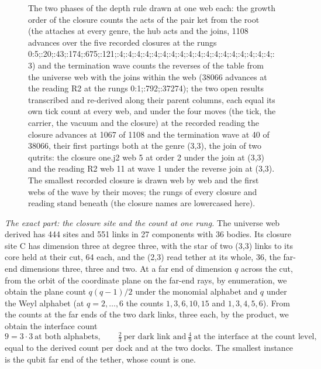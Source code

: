 \begin{chproof}
\begin{figure}[htbp]
\caption{The two phases of the depth rule drawn at one web each: the growth order of the closure counts the acts of the pair ket from the root (the attaches at every genre, the hub acts and the joins, 1108 advances over the five recorded closures at the rungs 0:5;:20;:43;:174;:675;:121;:4;:4;:4;:4;:4;:4;:4;:4;:4;:4;:4;:4;:4;:4;:4;:4;:4;:4;:3) and the termination wave counts the reverses of the table from the universe web with the joins within the web (38066 advances at the reading R2 at the rungs 0:1;:792;:37274); the two open results transcribed and re-derived along their parent columns, each equal its own tick count at every web, and under the four moves (the tick, the carrier, the vacuum and the closure) at the recorded reading the closure advances at 1067 of 1108 and the termination wave at 40 of 38066, their first partings both at the genre (3,3), the join of two qutrits: the closure one.j2 web 5 at order 2 under the join at (3,3) and the reading R2 web 11 at wave 1 under the reverse join at (3,3). The smallest recorded closure is drawn web by web and the first webs of the wave by their moves; the rungs of every closure and reading stand beneath (the closure names are lowercased here).}\label{fig:X-3-D544514-two-phases}
\end{figure}

\textit{The exact part: the closure site and the count at one rung.} The universe web derived has 444 sites and 551 links in 27 components with 36 bodies. Its closure site C has dimension three at degree three, with the star of two (3,3) links to its core held at their cut, 64 each, and the (2,3) read tether at its whole, 36, the far-end dimensions three, three and two. At a far end of dimension $q$ across the cut, from the orbit of the coordinate plane on the far-end rays, by enumeration, we obtain the plane count $q(q-1)/2$ under the monomial alphabet and $q$ under the Weyl alphabet (at $q=2,\dots,6$ the counts $1,3,6,10,15$ and $1,3,4,5,6$). From the counts at the far ends of the two dark links, three each, by the product, we obtain the interface count
\begin{equation}
9=3\cdot 3\ \text{at both alphabets},\qquad \tfrac{2}{3}\ \text{per dark link and}\ \tfrac{4}{9}\ \text{at the interface at the count level},
\end{equation}
equal to the derived count per dock and at the two docks. The smallest instance is the qubit far end of the tether, whose count is one.


\end{chproof}

